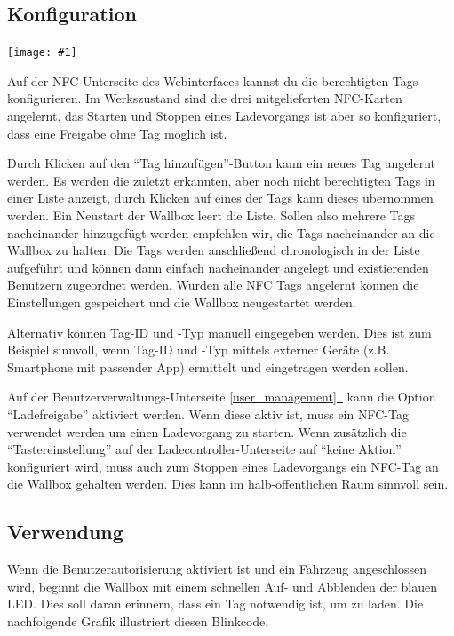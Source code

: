 \documentclass[a4paper,10pt]{article}
\newcommand{\gfx}[1]{\texttt{[image: \#1]}}
\newcommand*{\fullref}[1]{\hyperref[{#1}]{\ref*{#1}~\nameref*{#1}}}
\begin{document}
\begin{multicols*}{2}
	\subsection{Konfiguration}
	\gfx{./img_warp2/resized/web_nfc}

	Auf der NFC-Unterseite des Webinterfaces kannst du die berechtigten Tags konfigurieren.
	Im Werkszustand sind die drei mitgelieferten NFC-Karten angelernt,
	das Starten und Stoppen eines Ladevorgangs ist aber so konfiguriert, dass eine
	Freigabe ohne Tag möglich ist.

	Durch Klicken auf den \enquote{Tag hinzufügen}-Button kann ein neues Tag angelernt werden.
	Es werden die zuletzt erkannten, aber noch nicht berechtigten Tags in einer
	Liste anzeigt, durch Klicken auf eines der Tags kann dieses übernommen werden. Ein Neustart der
	Wallbox leert die Liste. Sollen also mehrere Tags nacheinander hinzugefügt
	werden empfehlen wir, die Tags nacheinander an die Wallbox zu halten. Die
	Tags werden anschließend chronologisch in der Liste aufgeführt und können
	dann einfach nacheinander angelegt und existierenden Benutzern zugeordnet
	werden. Wurden alle NFC Tags angelernt können die Einstellungen gespeichert und die
	Wallbox neugestartet werden.

	\columnbreak

	Alternativ können Tag-ID und -Typ manuell eingegeben werden. Dies ist zum Beispiel sinnvoll,
	wenn Tag-ID und -Typ mittels externer Geräte (z.B. Smartphone mit passender
	App) ermittelt und eingetragen werden sollen.

	Auf der Benutzerverwaltungs-Unterseite \fullref{user_management} kann die Option \enquote{Ladefreigabe} aktiviert werden.
	Wenn diese aktiv ist, muss ein NFC-Tag verwendet werden um einen Ladevorgang zu starten.
	Wenn zusätzlich die \enquote{Tastereinstellung} auf der Ladecontroller-Unterseite auf \enquote{keine Aktion} konfiguriert wird,
	muss auch zum Stoppen eines Ladevorgangs ein NFC-Tag an die Wallbox gehalten werden. Dies kann im
	halb-öffentlichen Raum sinnvoll sein.

	\subsection{Verwendung}
	Wenn die Benutzerautorisierung aktiviert ist und ein Fahrzeug angeschlossen wird,
	beginnt die Wallbox mit einem schnellen Auf- und Abblenden der blauen LED.
	Dies soll daran erinnern, dass ein Tag notwendig ist, um zu laden. Die
	nachfolgende Grafik illustriert diesen Blinkcode.


\end{multicols*}
\end{document}
